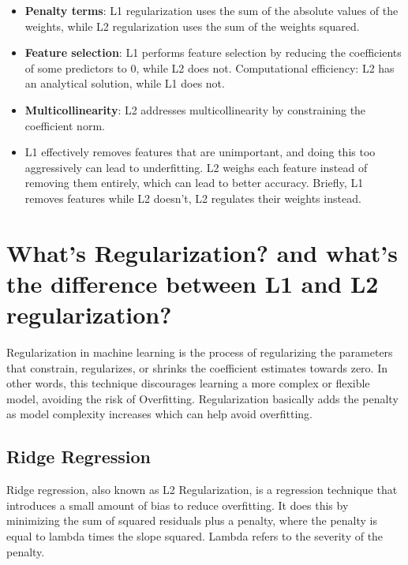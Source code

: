\documentclass[
]{book}
\begin{document}
\begin{itemize}
\item
  \textbf{Penalty terms}: L1 regularization uses the sum of the absolute values of the weights, while L2 regularization uses the sum of the weights squared.
\item
  \textbf{Feature selection}: L1 performs feature selection by reducing the coefficients of some predictors to 0, while L2 does not.
  Computational efficiency: L2 has an analytical solution, while L1 does not.
\item
  \textbf{Multicollinearity}: L2 addresses multicollinearity by constraining the coefficient norm.
\item
  L1 effectively removes features that are unimportant, and doing this too aggressively can lead to underfitting. L2 weighs each feature instead of removing them entirely, which can lead to better accuracy. Briefly, L1 removes features while L2 doesn't, L2 regulates their weights instead.
\end{itemize}

\hypertarget{whats-regularization-and-whats-the-difference-between-l1-and-l2-regularization}{%
\section{What's Regularization? and what's the difference between L1 and L2 regularization?}\label{whats-regularization-and-whats-the-difference-between-l1-and-l2-regularization}}

Regularization in machine learning is the process of regularizing the parameters that constrain, regularizes, or shrinks the coefficient estimates towards zero. In other words, this technique discourages learning a more complex or flexible model, avoiding the risk of Overfitting. Regularization basically adds the penalty as model complexity increases which can help avoid overfitting.

\hypertarget{ridge-regression}{%
\subsection{Ridge Regression}\label{ridge-regression}}

Ridge regression, also known as L2 Regularization, is a regression technique that introduces a small amount of bias to reduce overfitting. It does this by minimizing the sum of squared residuals plus a penalty, where the penalty is equal to lambda times the slope squared. Lambda refers to the severity of the penalty.
\end{document}
